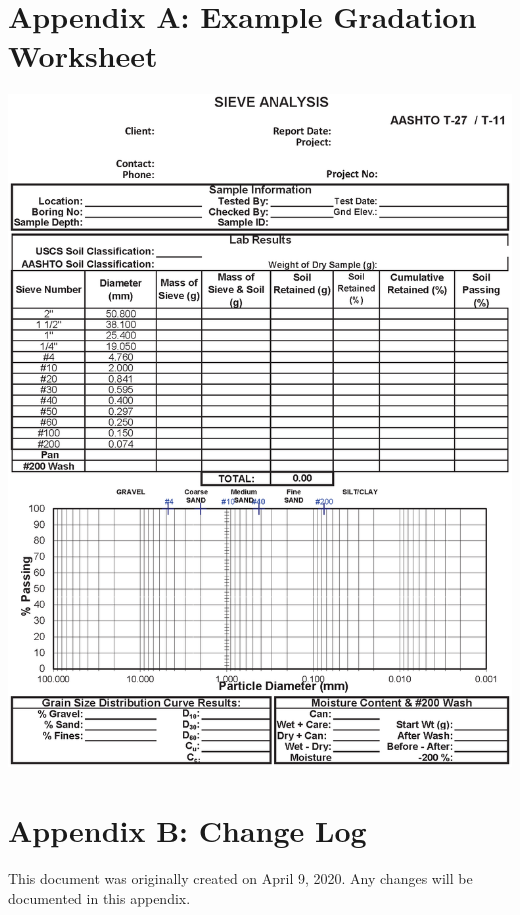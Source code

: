 \documentclass[12pt]{article}
\begin{document}
\section*{Appendix A: Example Gradation Worksheet}
\label{AppendixA}
\begin{center}
    \includegraphics[width=1\linewidth]{Example_Sieve_Analysis_Worksheet.eps}
\end{center}

\pagebreak
\section*{Appendix B: Change Log}
This document was originally created on April 9, 2020. Any changes will be documented in this appendix.
\end{document}
